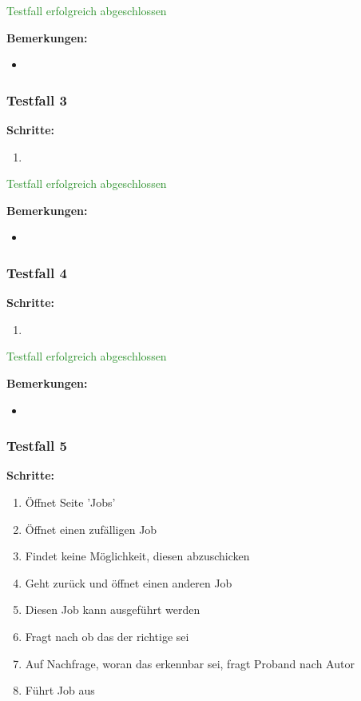 \textcolor{ForestGreen}{Testfall erfolgreich abgeschlossen}

\bigskip
\textbf{Bemerkungen:}

\begin{itemize}[noitemsep,nolistsep]
    \item 
\end{itemize}


\subsubsection*{Testfall 3}

\textbf{Schritte:}

\begin{enumerate}
    \item 
\end{enumerate}

\textcolor{ForestGreen}{Testfall erfolgreich abgeschlossen}

\bigskip
\textbf{Bemerkungen:}

\begin{itemize}[noitemsep,nolistsep]
    \item 
\end{itemize}


\subsubsection*{Testfall 4}

\textbf{Schritte:}

\begin{enumerate}
    \item 
\end{enumerate}

\textcolor{ForestGreen}{Testfall erfolgreich abgeschlossen}

\bigskip
\textbf{Bemerkungen:}

\begin{itemize}[noitemsep,nolistsep]
    \item 
\end{itemize}

\subsubsection*{Testfall 5}

\textbf{Schritte:}

\begin{enumerate}
    \item Öffnet Seite 'Jobs'
    \item Öffnet einen zufälligen Job
    \item Findet keine Möglichkeit, diesen abzuschicken
    \item Geht zurück und öffnet einen anderen Job
    \item Diesen Job kann ausgeführt werden
    \item Fragt nach ob das der richtige sei
    \item Auf Nachfrage, woran das erkennbar sei, fragt Proband nach Autor
    \item Führt Job aus
\end{enumerate}

